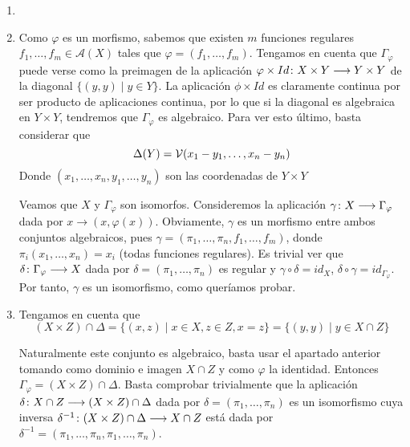 \documentclass[twoside]{article}
\begin{document}
\begin{solucion}
\begin{enumerate}
\item[]
\item Como $\varphi$ es un morfismo, sabemos que existen $m$ funciones regulares $f_1,\dotsc, f_m \in \mathcal{A}(X)$ tales que $\varphi = (f_1,\dotsc,f_m)$. Tengamos en cuenta que $\Gamma_\varphi$ puede verse como la preimagen de la aplicación $\varphi\times Id \colon{X\times Y}\longrightarrow{Y\times Y}$ de la diagonal $\{(y,y)\mid y\in Y\}$. La aplicación $\phi \times Id$ es claramente continua por ser producto de aplicaciones continua, por lo que si la diagonal es algebraica en $Y\times Y$, tendremos que $\Gamma_\varphi$ es algebraico. Para ver esto último, basta considerar que
$$
\Delta(Y) = \mathcal{V}(x_1-y_1,\dotsc,x_n-y_n)
$$
Donde $(x_1,\dotsc,x_n,y_1,\dotsc,y_n)$ son las coordenadas de $Y\times Y$



Veamos que $X$ y $\Gamma_\varphi$ son isomorfos. Consideremos la aplicación $\gamma\colon{X}\longrightarrow{\Gamma_\varphi}$ dada por $x\to (x,\varphi(x))$. Obviamente, $\gamma$ es un morfismo entre ambos conjuntos algebraicos, pues $\gamma = (\pi_1,\dotsc,\pi_n,f_1,\dotsc,f_m)$, donde $\pi_i(x_1,\dotsc,x_n)=x_i$ (todas funciones regulares). Es trivial ver que $\delta\colon{\Gamma_\varphi}\longrightarrow{X}$ dada por $\delta = (\pi_1,\dotsc,\pi_n)$ es regular y $\gamma \circ \delta = id_X$, $\delta \circ \gamma = id_{\Gamma_\varphi}$. Por tanto, $\gamma$ es un isomorfismo, como queríamos probar.
\item Tengamos en cuenta que 
$$
(X\times Z)\cap \Delta = \{(x,z)\mid x\in X, z\in Z, x=z\} = \{(y,y)\mid y\in X\cap Z\} 
$$

Naturalmente este conjunto es algebraico, basta usar el apartado anterior tomando como dominio e imagen $X\cap Z$ y como $\varphi$ la identidad. Entonces $\Gamma_\varphi = (X\times Z)\cap \Delta$. Basta comprobar trivialmente que la aplicación $\delta\colon{X\cap Z}\longrightarrow{(X\times Z)\cap \Delta}$ dada por $\delta = (\pi_1,\dotsc,\pi_n)$ es un isomorfismo cuya inversa $\delta^{-1}\colon{(X\times Z)\cap \Delta}\longrightarrow{X\cap Z}$ está dada por $\delta^{-1}=(\pi_1,\dotsc,\pi_n,\pi_1,\dotsc,\pi_n)$.
\end{enumerate}

\end{solucion}
\newpage 
\end{document}
